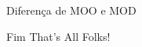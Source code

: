 \documentclass{beamer}
\begin{document}
\begin{frame}[t]{Diferença de MOO e MOD}
\begin{figure}
\begin{minipage}[b]{0.35\textwidth}
        \end{minipage}
    \end{figure}
\end{frame}

\begin{frame}{Fim}
    \centering
    \LARGE{That's All Folks!}
\end{frame}
\end{document}
